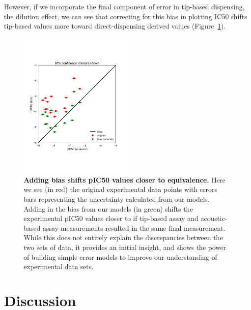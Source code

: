 \documentclass[aps,pre,twocolumn,nofootinbib,superscriptaddress,linenumbers]{revtex4-1}
\begin{document}
However, if we incorporate the final component of error in tip-based dispensing, the dilution effect, we can see that correcting for this bias in plotting IC50 shifts tip-based values more toward direct-dispensing derived values (Figure~\ref{fig:IC50_bias}).

\begin{figure}[tb]
    \includegraphics[trim={0 4cm 0 4cm},clip,width=0.5\textwidth]{../figures/compare-pIC50-bias_corrected.pdf}

  \caption{{\bf Adding bias shifts pIC50 values closer to equivalence.}
  Here we see (in red) the original experimental data points with errors bars representing the uncertainty calculated from our models. Adding in the bias from our models (in green) shifts the experimental pIC50 values closer to if tip-based assay and acoustic-based assay measurements resulted in the same final measurement. While this does not entirely explain the discrepancies between the two sets of data, it provides an initial insight, and shows the power of building simple error models to improve our understanding of experimental data sets.
  }
  \label{fig:IC50_bias}
\end{figure}

\section{Discussion}
\end{document}
